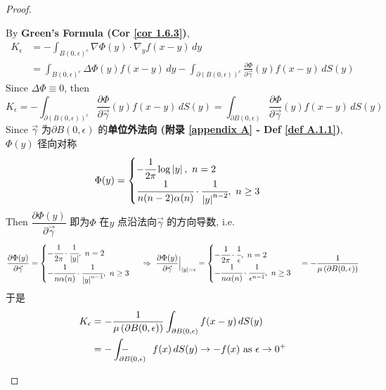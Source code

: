 \begin{thm}
\begin{proof}
\begin{enumerate}
\begin{itemize}
					\vspace{1em}
					
					By \textbf{Green's Formula (Cor \ref{cor 1.6.3})}, 
					\begin{align}
						K_\epsilon 
						&= -\int_{B(0 , \epsilon)^c} \nabla \Phi(y) \cdot \nabla_y f(x - y) \, dy \\
						&= \int_{B(0 , \epsilon)^c} \Delta \Phi(y) f(x - y) \, dy - \int_{\partial \left( B(0 , \epsilon) \right)^c} \frac{\partial \Phi}{\partial \vec{\gamma}}(y) f(x - y) \, dS(y)
					\end{align}
					Since $\Delta \Phi \equiv 0$, then 
					\[ K_\epsilon = - \int_{\partial \left( B(0 , \epsilon) \right)^c} \frac{\partial \Phi}{\partial \vec{\gamma}}(y) f(x - y) \, dS(y) 
					= \int_{\partial B(0 , \epsilon)} \frac{\partial \Phi}{\partial \vec{\gamma}} (y) f(x - y) \, dS(y) \]
					Since $\vec{\gamma}$ 为$\partial B(0 , \epsilon)$ 的\textbf{单位外法向 (附录 \ref{appendix A} - Def \ref{def A.1.1})}, $\Phi(y)$ 径向对称
					\[ 
					 \Phi(y) = 
					 \begin{cases}
					 	-\cfrac{1}{2\pi} \log \left| y \right| , \,\, n = 2 \\
					 	\cfrac{1}{n (n - 2) \alpha(n)} \cdot \cfrac{1}{\left| y \right|^{n - 2}} , \,\, n \geq 3
					 \end{cases} 
				 	\]
				 	Then $\dfrac{\partial \Phi(y)}{\partial \vec{\gamma}}$ 即为$\Phi$ 在$y$ 点沿法向$\vec{\gamma}$ 的方向导数, i.e. 
				 	\[ 
				 	 \frac{\partial \Phi (y)}{\partial \vec{\gamma}} = 
				 	 \begin{cases}
				 	 	-\cfrac{1}{2\pi} \cdot \cfrac{1}{\left| y \right|} , \,\, n = 2 \\
				 	 	- \cfrac{1}{n \alpha(n)} \cdot \cfrac{1}{\left| y \right|^{n - 1}} , \,\, n \geq 3
				 	 \end{cases} \,\, \Rightarrow \,\, 
			 	 	\frac{\partial \Phi (y)}{\partial \vec{\gamma}} \Big|_{\left| y \right| = \epsilon} = 
			 	 	\begin{cases}
			 	 		-\cfrac{1}{2\pi} \cdot \cfrac{1}{\epsilon} , \,\, n = 2 \\
			 	 		- \cfrac{1}{n \alpha(n)} \cdot \cfrac{1}{\epsilon^{n - 1}} , \,\, n \geq 3
			 	 	\end{cases} 
		 	 		= - \frac{1}{\mu \left( \partial B(0 , \epsilon) \right)}
			 	 	\]
			 	 	于是
			 	 	\begin{align}
			 	 		K_\epsilon 
			 	 		&= -\frac{1}{\mu \left( \partial B(0 , \epsilon) \right)} \int_{\partial B(0 , \epsilon)} f(x - y) \, dS(y) \\
			 	 		&= - \int_{\partial B(0 , \epsilon)}\hspace{-2.70em}-\ \hspace*{2.05em} f(x) \, d S(y) \to - f(x) \,\, \text{as} \,\, \epsilon \to 0^+
			 	 	\end{align}
				\end{itemize}
				

\end{enumerate}
\end{proof}
\end{thm}
